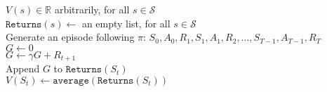 \documentclass{standalone}
\begin{document}
\pagestyle{empty}
\begin{algorithm}[H]
  \caption{}
  $V(s) \in \mathbb R$ arbitrarily, for all $s \in \mathcal S$ \\
  $\texttt{Returns}(s) \gets$ an empty list, for all $s \in \mathcal S$ \\
   {
    Generate an episode following $\pi$: $S_0, A_0, R_1, S_1, A_1, R_2,     \ldots,S_{T-1}, A_{T-1}, R_T$ \\
    $G\gets 0$ \\
     {
      $G \gets \gamma G + R_{t+1}$ \\
       {
        Append $G$ to $\texttt{Returns}(S_t)$ \\
        $V(S_t) \gets \texttt{average}(\texttt{Returns}(S_t))$
      }
    }
  }
\end{algorithm}
\end{document}
